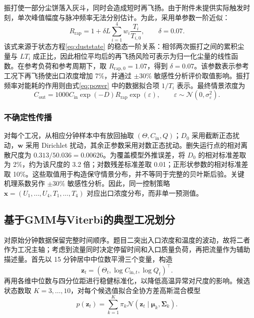 振打使一部分尘饼落入灰斗，同时会造成短时再飞扬\cite{bush1984rapping,neundorfer1981rapping}。由于附件未提供实际触发时刻，单次峰值幅度与脉冲频率无法分别估计。为此，采用单参数一阶近似：
\begin{equation}
R_{\mathrm{rap}}=1+\delta L\sum_{i=1}^{4}w_i
\frac{T_i}{T_{i,0}},\qquad \delta=0.07.
\label{eq:rapfactor}
\end{equation}
该式来源于状态方程\eqref{eq:duststate} 的稳态一阶关系：相邻两次振打之间的累积尘量与 $LT_i$ 成正比，因此相位平均后的再飞扬风险可表示为归一化尘量的线性函数。在参考负荷和参考周期下，取 $R_{\mathrm{rap},0}=1.07$，得到 $\delta=0.07$。该参数表示参考工况下再飞扬使出口浓度增加 7\%，并通过 $\pm30\%$ 敏感性分析评价取值影响。振打频率对能耗的作用则由式\eqref{eq:power} 中的数据拟合项 $1/T_i$ 表示。最终情景浓度为
\begin{equation}
C_{\mathrm{out}}=1000C_{\mathrm{in}}\exp(-D)R_{\mathrm{rap}}\exp(\varepsilon),
\qquad \varepsilon\sim\mathcal N(0,\sigma_\varepsilon^2).
\label{eq:fulltwin}
\end{equation}

\subsubsection{不确定性传播}

对每个工况，从相应分钟样本中有放回抽取 $(\Theta,C_{\mathrm{in}},Q)$；$D_0$ 采用截断正态扰动，$\bm w$ 采用 Dirichlet 扰动，其余正参数采用对数正态扰动。删失运行点的相对离散尺度为 $0.313/50.036=0.00626$。为覆盖模型外推误差，将 $D_0$ 的相对标准差取为 2\%，约为该尺度的 3.2 倍；对数残差标准差取 0.01；正形状参数的相对标准差取 10\%。这些取值用于构造保守情景分布，并不等同于完整的贝叶斯后验。关键机理系数另作 $\pm30\%$ 敏感性分析。因此，同一控制策略 $\bm x=(U_1,\ldots,U_4,T_1,\ldots,T_4)$ 对应出口浓度分布，而非单一预测值。

\subsection{基于GMM与Viterbi的典型工况划分}

对原始分钟数据保留完整时间顺序。题目二突出入口浓度和温度的波动，故将二者作为工况主轴；考虑到流量同时决定停留时间和入口质量负荷，再把流量作为辅助描述量。首先以 15 分钟居中中位数平滑三个变量，构造
\begin{equation}
\bm z_t=\left(\Theta_t,\log C_{\mathrm{in},t},\log Q_t\right)^\top.
\end{equation}
再用各维中位数与四分位距进行稳健标准化，以降低高温异常对尺度的影响。候选状态数取 $K=3,\ldots,10$，对每个候选值拟合全协方差高斯混合模型
\begin{equation}
p(\bm z_t)=\sum_{k=1}^{K}\pi_k\mathcal N(\bm z_t\mid\bm\mu_k,\bm\Sigma_k).
\label{eq:gmm}
\end{equation}

